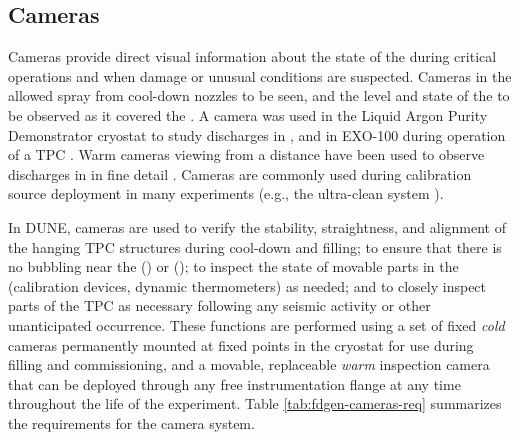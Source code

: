 \subsection{Cameras}
\label{sec:fdgen-slow-cryo-cameras}

Cameras provide direct visual information about the state of the
 during critical operations and when damage or unusual
conditions are suspected.  Cameras in the  allowed spray from cool-down
nozzles to be seen, and the level and state of the \lar to be
observed as it covered the  \cite{Murphy:20170516}.  A camera was
used in the Liquid Argon Purity Demonstrator
cryostat\cite{Adamowski:2014daa} to study  discharges in
\lar, and in EXO-100 during operation of a TPC
\cite{Delaquis:2013hva}.  Warm cameras viewing \lar from a distance
have been used to observe  discharges in \lar in
fine detail \cite{Auger:2015xlo}.  Cameras are commonly used during
calibration source deployment in many experiments (e.g., the
\kamland ultra-clean system \cite{Banks:2014hra}).

In DUNE, cameras are used to verify the stability, straightness,
and alignment of the hanging TPC structures during cool-down and
filling; to ensure that there is no bubbling near the 
(\single) or  (\dual); to inspect the
state of movable parts in the  (calibration devices, dynamic
thermometers) as needed; and to closely inspect parts of the TPC as
necessary following any seismic activity or other unanticipated
occurrence.  These functions are performed using a set of fixed
\textit{cold} cameras permanently mounted at fixed points in the cryostat
for use during filling and commissioning, and a movable, replaceable
\textit{warm} inspection camera that can be deployed through any free
instrumentation flange at any time throughout the life of the
experiment.  Table \ref{tab:fdgen-cameras-req} summarizes the
requirements for the camera system.

